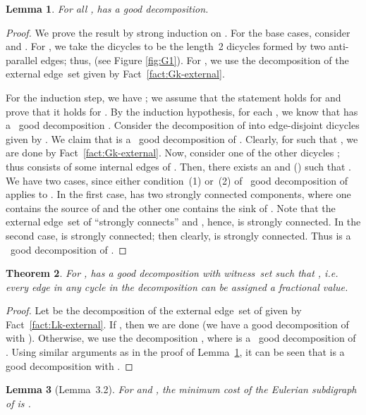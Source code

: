 \documentclass[11pt]{article}
\newtheorem{theorem}{Theorem}[section]
\newtheorem{lemma}[theorem]{Lemma}
\begin{document}
\begin{lemma}
\label{lem:pre_CGK}
For all ,  has a  good decomposition. 
\end{lemma}
\begin{proof}
We prove the result by strong induction on .
For the base cases, consider  and .
For , we take the dicycles 
to be the length~2 dicycles formed by two anti-parallel edges;
thus,  (see Figure \ref{fig:G1}).
For , we use the decomposition of the external edge~set given
by Fact~\ref{fact:Gk-external}.

For the induction step, we have ;
we assume that the statement holds for  and
prove that it holds for .
By the induction hypothesis, for each ,
we know that  has
a ~good decomposition
.
Consider the decomposition of  into edge-disjoint dicycles
given by
.
We claim that  is a ~good decomposition of .
Clearly, for  such that
,
we are done by Fact~\ref{fact:Gk-external}.
Now, consider one of the other dicycles ;
thus  consists of some internal edges of .
Then, there exists an  and  ()
such that .
We have two cases, since either condition~(1) or~(2)
of ~good decomposition of  applies to .
In the first case,
 has two strongly connected components,
where one contains the source  of
 and
the other one contains the sink  of
.
Note that the external edge~set of  ``strongly connects''
 and , hence,  is strongly connected.
In the second case,  is strongly connected;
then clearly,  is strongly connected.
Thus  is a ~good decomposition of .
\end{proof}


\begin{theorem}
\label{thm:CGK}
For ,
 has a good decomposition
with witness~set  such that ,
i.e. every edge in any cycle in the decomposition can be assigned a fractional value. 
\end{theorem}
\begin{proof}
Let 
be the decomposition of the external edge~set of 
given by Fact~\ref{fact:Lk-external}.
If , then we are done (we have a good decomposition of 
with ).
Otherwise, we use the decomposition
,
where  is a
~good decomposition of .
Using similar arguments as in the proof of Lemma~\ref{lem:pre_CGK},
it can be seen that  is a good decomposition with
.
\end{proof}


\begin{lemma}[Lemma~3.2\cite{CGK06}]
\label{lem:CGK}
For  and , the minimum cost of
the Eulerian subdigraph of  is .
\end{lemma}
\end{document}
